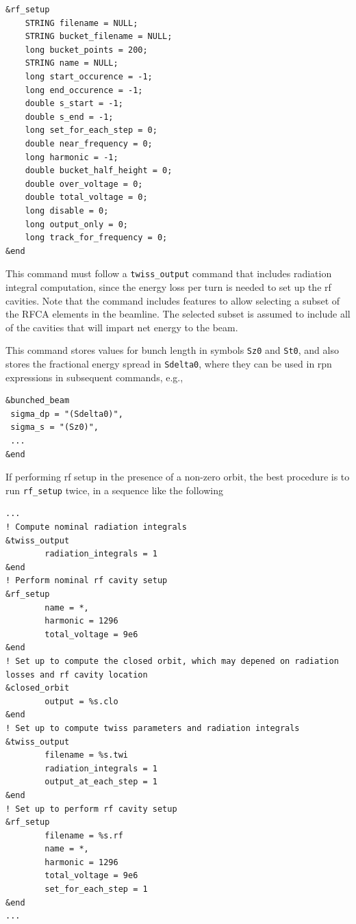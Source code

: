 \documentclass[11pt]{article}
\begin{document}
\begin{verbatim}
&rf_setup
    STRING filename = NULL;
    STRING bucket_filename = NULL;
    long bucket_points = 200;
    STRING name = NULL;
    long start_occurence = -1;
    long end_occurence = -1;
    double s_start = -1;
    double s_end = -1;
    long set_for_each_step = 0;
    double near_frequency = 0; 
    long harmonic = -1;
    double bucket_half_height = 0;
    double over_voltage = 0;
    double total_voltage = 0;
    long disable = 0;
    long output_only = 0;
    long track_for_frequency = 0;
&end
\end{verbatim}

This command must follow a \verb|twiss_output| command that includes radiation integral computation, since the 
energy loss per turn is needed to set up the rf cavities.
Note that the command includes features to allow selecting a subset of the RFCA elements in the beamline.
The selected subset is assumed to include all of the cavities that will impart net energy to the beam.

This command stores values for bunch length in symbols \verb|Sz0| and \verb|St0|, and also stores the fractional
energy spread in \verb|Sdelta0|, where they can be used in rpn expressions in subsequent  commands, e.g.,
\begin{verbatim}
&bunched_beam
 sigma_dp = "(Sdelta0)",
 sigma_s = "(Sz0)",
 ...
&end
\end{verbatim}

If performing rf setup in the presence of a non-zero orbit, the best procedure is to run \verb|rf_setup| twice,
in a sequence like the following
\begin{verbatim}
...
! Compute nominal radiation integrals
&twiss_output
        radiation_integrals = 1
&end
! Perform nominal rf cavity setup
&rf_setup
        name = *,
        harmonic = 1296
        total_voltage = 9e6
&end
! Set up to compute the closed orbit, which may depened on radiation losses and rf cavity location
&closed_orbit
        output = %s.clo       
&end
! Set up to compute twiss parameters and radiation integrals
&twiss_output
        filename = %s.twi
        radiation_integrals = 1
        output_at_each_step = 1
&end
! Set up to perform rf cavity setup
&rf_setup
        filename = %s.rf
        name = *,
        harmonic = 1296
        total_voltage = 9e6
        set_for_each_step = 1
&end
...
\end{verbatim}
\end{document}
